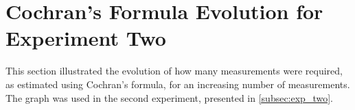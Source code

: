 \section{Cochran's Formula Evolution for Experiment Two}\label{app:cockh_exp}

This section illustrated the evolution of how many measurements were required, as estimated using Cochran's formula, for an increasing number of measurements. The graph was used in the second experiment, presented in \cref{subsec:exp_two}.

